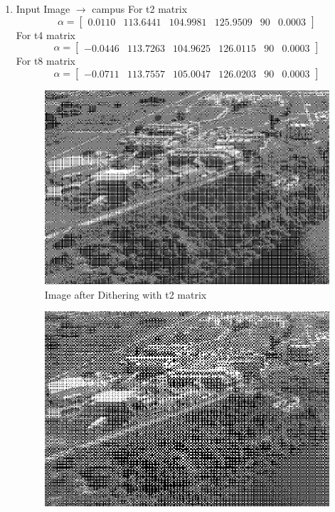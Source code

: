 \documentclass{article}
\begin{document}
    \begin{enumerate}
    \item Input Image $\longrightarrow$ campus
    \newline
    For t2 matrix
    \[
    \alpha=
    \begin{bmatrix} 
     0.0110 &	113.6441 &	104.9981 &	125.9509 &	90	& 0.0003
    \end{bmatrix}
    \]
    For t4 matrix
    \[
    \alpha=
    \begin{bmatrix} 
      -0.0446 &	113.7263 &	104.9625 &	126.0115 &	90 &	0.0003 
    \end{bmatrix}
    \]
    For t8 matrix
    \[
    \alpha=
    \begin{bmatrix} 
      -0.0711 &	113.7557 &	105.0047 &	126.0203 &	90 &	0.0003
    \end{bmatrix}
    \]
    \begin{figure}[H]
        \centering
        \includegraphics[width=0.75\linewidth]{311.png}
        \caption{Image after Dithering with t2 matrix}
        \label{fig:Image after Dithering with t2 matrix}
    \end{figure}
    \begin{figure}[H]
        \centering
        \includegraphics[width=0.75\linewidth]{312.png}

\end{figure}
\end{enumerate}
\end{document}
